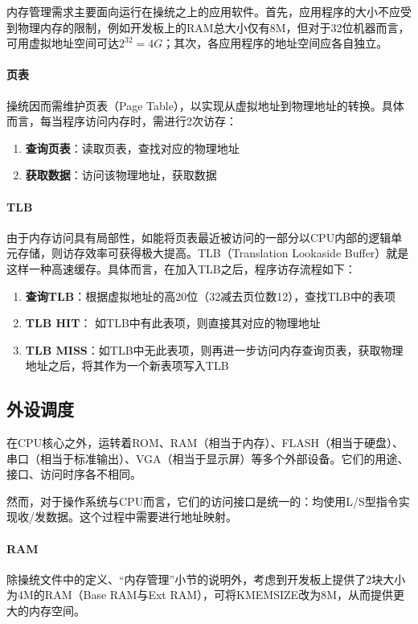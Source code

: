 内存管理需求主要面向运行在操统之上的应用软件。首先，应用程序的大小不应受到物理内存的限制，例如开发板上的RAM总大小仅有8M，但对于32位机器而言，可用虚拟地址空间可达$2^{32} = 4G$；其次，各应用程序的地址空间应各自独立。

\paragraph{页表}
操统因而需维护页表（Page Table），以实现从虚拟地址到物理地址的转换。具体而言，每当程序访问内存时，需进行2次访存：
\begin{enumerate}
    \item {\bf 查询页表}：读取页表，查找对应的物理地址
    \item {\bf 获取数据}：访问该物理地址，获取数据
\end{enumerate}


\paragraph{TLB}
由于内存访问具有局部性，如能将页表最近被访问的一部分以CPU内部的逻辑单元存储，则访存效率可获得极大提高。TLB（Translation Lookaside Buffer）就是这样一种高速缓存。具体而言，在加入TLB之后，程序访存流程如下：

\begin{enumerate}
    \item {\bf 查询TLB}：根据虚拟地址的高20位（32减去页位数12），查找TLB中的表项
    \item {\bf TLB HIT}： 如TLB中有此表项，则直接其对应的物理地址
    \item {\bf TLB MISS}：如TLB中无此表项，则再进一步访问内存查询页表，获取物理地址之后，将其作为一个新表项写入TLB
\end{enumerate}

\subsection{外设调度}

在CPU核心之外，运转着ROM、RAM（相当于内存）、FLASH（相当于硬盘）、串口（相当于标准输出）、VGA（相当于显示屏）等多个外部设备。它们的用途、接口、访问时序各不相同。

然而，对于操作系统与CPU而言，它们的访问接口是统一的：均使用L/S型指令实现收/发数据。这个过程中需要进行地址映射。

\paragraph{RAM}
除操统文件中的定义、``内存管理''小节的说明外，考虑到开发板上提供了2块大小为4M的RAM（Base RAM与Ext RAM），可将KMEMSIZE改为8M，从而提供更大的内存空间。

